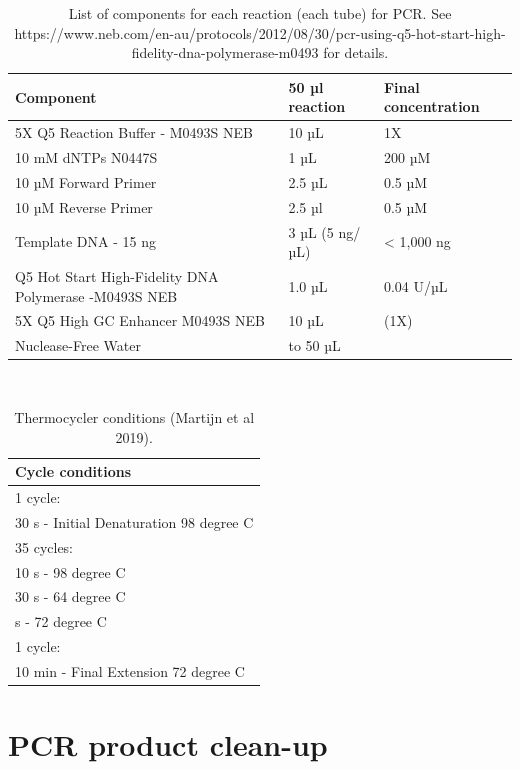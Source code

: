 \documentclass[
]{book}
\begin{document}
\begin{table}

\caption{\label{tab:table}List of components for each reaction (each tube) for PCR. See https://www.neb.com/en-au/protocols/2012/08/30/pcr-using-q5-hot-start-high-fidelity-dna-polymerase-m0493 for details.  }
\centering
\begin{tabular}[t]{lll}
\toprule
Component & 50 µl reaction & Final concentration\\
\midrule
5X Q5 Reaction Buffer - M0493S NEB & 10 µL & 1X\\
10 mM dNTPs N0447S & 1 µL & 200 µM\\
10 µM Forward Primer & 2.5 µL & 0.5 µM\\
10 µM Reverse Primer & 2.5 µl & 0.5 µM\\
Template DNA - 15 ng & 3 µL (5 ng/µL) & < 1,000 ng\\
\addlinespace
Q5 Hot Start High-Fidelity DNA Polymerase -M0493S NEB & 1.0 µL & 0.04 U/µL\\
5X Q5 High GC Enhancer M0493S NEB & 10 µL & (1X)\\
Nuclease-Free Water & to 50 µL & \\
\bottomrule
\end{tabular}
\end{table}

~

\begin{table}

\caption{\label{tab:table2}Thermocycler conditions (Martijn et al 2019).}
\centering
\begin{tabular}[t]{l}
\toprule
Cycle conditions\\
\midrule
1 cycle:\\
30 s - Initial Denaturation 98 degree C\\
35 cycles:\\
10 s - 98 degree C\\
30 s -  64 degree C\\
\addlinespace
210 s - 72 degree C\\
1 cycle:\\
10 min - Final Extension  72 degree C\\
\bottomrule
\end{tabular}
\end{table}

\hfill\break

\section{PCR product clean-up}\label{pcr-product-clean-up}
\end{document}
